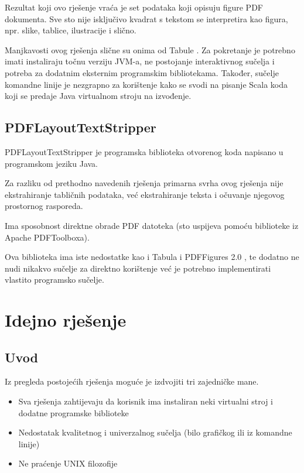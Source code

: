 \documentclass[times, utf8, zavrsni]{fer}
\begin{document}
Rezultat koji ovo rješenje vraća je set podataka koji opisuju figure PDF
dokumenta. Sve sto nije isključivo kvadrat s tekstom se interpretira kao
figura, npr. slike, tablice, ilustracije i slično.

Manjkavosti ovog rješenja slične su onima od Tabule \cite{tabula_repository}.
Za pokretanje je potrebno
imati instaliraju točnu verziju JVM-a, ne postojanje interaktivnog sučelja i
potreba za dodatnim eksternim programskim bibliotekama. Također, sučelje
komandne linije je nezgrapno za korištenje kako se svodi na pisanje Scala koda
koji se predaje Java virtualnom stroju na izvođenje.

\section{PDFLayoutTextStripper}

PDFLayoutTextStripper \cite{pdflayouttextstripper_repository} je programska
biblioteka otvorenog koda napisano u programskom jeziku Java.

Za razliku od prethodno navedenih rješenja primarna svrha ovog rješenja nije
ekstrahiranje tabličnih podataka, već ekstrahiranje teksta i očuvanje njegovog
prostornog rasporeda.

Ima sposobnost direktne obrade PDF datoteka (sto uspijeva pomoću biblioteke iz
Apache PDFToolboxa).

Ova biblioteka ima iste nedostatke kao i Tabula \cite{tabula_repository} i
PDFFigures 2.0 \cite{pdffigures_2_repository}, te dodatno ne
nudi nikakvo sučelje za direktno korištenje već je potrebno implementirati
vlastito programsko sučelje.



\chapter{Idejno rješenje}

\section{Uvod}

Iz pregleda postojećih rješenja moguće je izdvojiti tri zajedničke mane.

\begin{itemize}
  \item Sva rješenja zahtijevaju da korisnik ima instaliran neki virtualni
    stroj i dodatne  programske biblioteke
  \item Nedostatak kvalitetnog i univerzalnog sučelja (bilo grafičkog ili iz
    komandne linije)
  \item Ne praćenje UNIX filozofije \cite{unix_philosophy}
\end{itemize}
\end{document}
